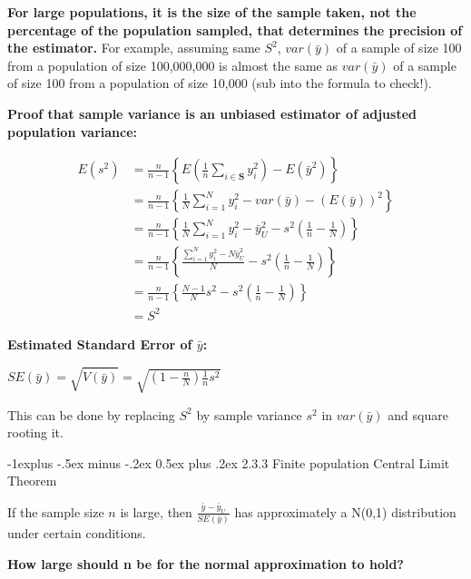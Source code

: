 \documentclass[10pt,landscape]{article}
\makeatletter
\renewcommand{\subsection}{\@startsection{subsection}{2}{0mm}%
                                {-1explus -.5ex minus -.2ex}%
                                {0.5ex plus .2ex}%
                                {\normalfont\normalsize\bfseries}}
\makeatother
\begin{document}
\begin{multicols}{3}
\textbf{For large populations, it is the size of the sample taken, not the percentage of the population sampled, that determines the precision of the estimator.} For example, assuming same $S^{2}$, $var(\bar{y})$ of a sample of size 100 from a population of size 100,000,000 is almost the same as $var(\bar{y})$ of a sample of size 100 from a population of size 10,000 (sub into the formula to check!).

\vspace{10}

\textbf{Proof that sample variance is an unbiased estimator of adjusted population variance: }

\begin{equation}
\begin{split}
  E(s^{2}) &= \frac{n}{n-1}\left\{E(\frac{1}{n}\sum_{i \in \textbf{S}}y_{i}^{2}) - E(\bar{y}^{2})\right\}\\
  &= \frac{n}{n-1}\left\{\frac{1}{N}\sum_{i = 1}^{N}y_{i}^{2} - var(\bar{y}) - (E(\bar{y}))^{2}\right\}\\
  &= \frac{n}{n-1}\left\{\frac{1}{N}\sum_{i = 1}^{N}y_{i}^{2} - \bar{y}_{U}^{2} - s^{2}(\frac{1}{n}-\frac{1}{N})\right\}\\
  &= \frac{n}{n-1}\left\{\frac{\sum_{i = 1}^{N}y_{i}^{2} - N\bar{y}_{U}^{2}}{N} - s^{2}(\frac{1}{n}-\frac{1}{N})\right\}\\
  &= \frac{n}{n-1}\left\{\frac{N-1}{N}s^{2} - s^{2}(\frac{1}{n}-\frac{1}{N})\right\}\\
  &= S^{2}
\end{split}
\end{equation}

\textbf{Estimated Standard Error of $\bar{y}$: }

$SE(\bar{y}) = \sqrt{\hat{V}(\bar{y})} = \sqrt{(1-\frac{n}{N})\frac{1}{n}s^{2}}$

This can be done by replacing $S^{2}$ by sample variance $s^{2}$ in $var(\bar{y})$ and square rooting it.

\subsection{2.3.3 Finite population Central Limit Theorem}

If the sample size $n$ is large, then $\frac{\bar{y}-\bar{y}_{U}}{SE(\bar{y})}$ has approximately a N(0,1) distribution under certain conditions.

\vspace{10}

\textbf{How large should n be for the normal approximation to hold?}


\end{multicols}
\end{document}
